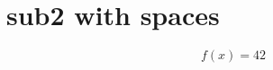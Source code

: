 \section{sub2 with spaces}
\label{sec:sub2 with spaces}

\begin{equation}
  f(x) = 42
  \label{eq:included sub with spaces is working}
\end{equation}
